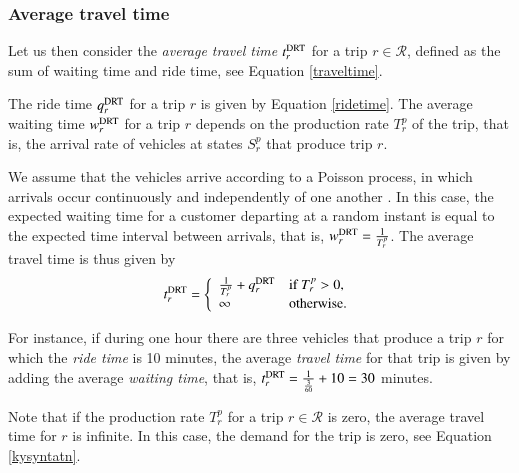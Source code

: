 \documentclass[dissertation,draft*]{aaltoseries}
\begin{document}
\subsubsection{Average travel time}
\label{averagetraveltime}
Let us then consider the \emph{average travel time} $t_{r}^{\rm DRT}$ for a trip $r \in \mathcal{R}$, 
defined as the sum of waiting time and ride time, see Equation \eqref{traveltime}.

The ride time $q_r^{\rm DRT}$ for a trip $r$ is given by Equation \eqref{ridetime}.
The average waiting time $w_r^{\rm DRT}$ for a trip $r$ depends on the production rate $T_r^p$ of the trip, 
that is, the arrival rate of vehicles at states $S_r^p$ that produce trip $r$.

We assume that the vehicles arrive according to a Poisson process, in which 
arrivals occur continuously and independently of one another \citep{ross}.
In this case, the
expected waiting time for a customer departing at a random instant is equal to the expected 
time interval between arrivals, that is, $w_r^{\rm DRT} = \frac {1}{T_{r}^p}$.
The average travel time is thus given by
\begin{align}
\label{ajoaika}
t_{r}^{\rm DRT}= 
\left\{
\begin{array}{ll}
\frac {1}{T_{r}^p} + q_r^{\rm DRT} & \mbox{if } T_{r}^p > 0, \\
\infty & \mbox{otherwise.}
\end{array}
\right.
\end{align}

For instance, if during one hour there are three vehicles that produce a trip $r$ 
for which the \emph{ride time} is 10 minutes, the average \emph{travel time} for that trip
is given by adding the average \emph{waiting time}, that is, $t_{r}^{\rm DRT}= \frac {1}{\frac{3}{60}}  + 10 = 30$ minutes.

Note that if the production rate $T_{r}^p$ for a trip $r \in \mathcal{R}$ is zero, the
average travel time for $r$ is infinite. In this case, the demand for the trip is zero, 
see Equation \eqref{kysyntatn}. 
\end{document}
